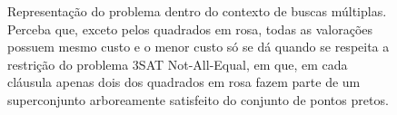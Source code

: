 \begin{figure}
    \caption{Representação do problema dentro do contexto de buscas múltiplas. Perceba que, exceto pelos quadrados em rosa, todas as valorações possuem mesmo custo e o menor custo só se dá quando se respeita a restrição do problema 3SAT Not-All-Equal, em que, em cada cláusula apenas dois dos quadrados em rosa fazem parte de um superconjunto arboreamente satisfeito do conjunto de pontos pretos.}
\label{fig:final}
\end{figure}